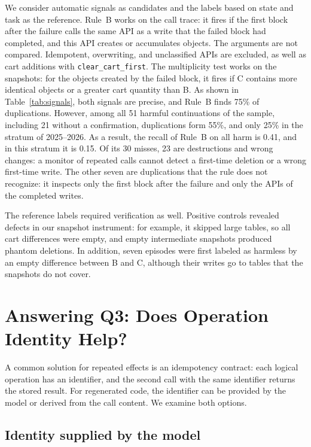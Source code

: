 \documentclass[conference]{IEEEtran}
\newcommand{\code}[1]{\texttt{\small #1}}
\begin{document}
We consider automatic signals as candidates and the labels based on state and task as the reference. Rule~B works on the call trace: it fires if the first block after the failure calls the same API as a write that the failed block had completed, and this API creates or accumulates objects. The arguments are not compared. Idempotent, overwriting, and unclassified APIs are excluded, as well as cart additions with \code{clear\_cart\_first}. The multiplicity test works on the snapshots: for the objects created by the failed block, it fires if C contains more identical objects or a greater cart quantity than B. As shown in Table~\ref{tab:signals}, both signals are precise, and Rule~B finds 75\% of duplications. However, among all 51 harmful continuations of the sample, including 21 without a confirmation, duplications form 55\%, and only 25\% in the stratum of 2025--2026. As a result, the recall of Rule~B on all harm is 0.41, and in this stratum it is 0.15. Of its 30 misses, 23 are destructions and wrong changes: a monitor of repeated calls cannot detect a first-time deletion or a wrong first-time write. The other seven are duplications that the rule does not recognize: it inspects only the first block after the failure and only the APIs of the completed writes.

The reference labels required verification as well. Positive controls revealed defects in our snapshot instrument: for example, it skipped large tables, so all cart differences were empty, and empty intermediate snapshots produced phantom deletions. In addition, seven episodes were first labeled as harmless by an empty difference between B and C, although their writes go to tables that the snapshots do not cover.

\section{Answering Q3: Does Operation Identity Help?}\label{sec:identity}

A common solution for repeated effects is an idempotency contract: each logical operation has an identifier, and the second call with the same identifier returns the stored result. For regenerated code, the identifier can be provided by the model or derived from the call content. We examine both options.

\subsection{Identity supplied by the model}
\end{document}
